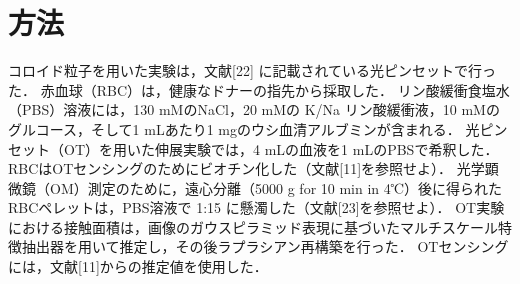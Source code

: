 \documentclass{jsarticle}
\numberwithin{equation}{section}
\theoremstyle{definition}
\begin{document}
\newpage 
\section{方法}
コロイド粒子を用いた実験は，文献[22] に記載されている光ピンセットで行った．
赤血球（RBC）は，健康なドナーの指先から採取した．
リン酸緩衝食塩水（PBS）溶液には，130 mMのNaCl，20 mMの K/Na リン酸緩衝液，10 mMのグルコース，そして1 mLあたり1 mgのウシ血清アルブミンが含まれる．
光ピンセット（OT）を用いた伸展実験では，4 mLの血液を1 mLのPBSで希釈した．
RBCはOTセンシングのためにビオチン化した（文献[11]を参照せよ）．
光学顕微鏡（OM）測定のために，遠心分離（5000 g for 10 min in 4℃）後に得られたRBCペレットは，PBS溶液で 1:15 に懸濁した（文献[23]を参照せよ）．
OT実験における接触面積は，画像のガウスピラミッド表現に基づいたマルチスケール特徴抽出器を用いて推定し，その後ラプラシアン再構築を行った．
OTセンシングには，文献[11]からの推定値を使用した．

\newpage 
\end{document}
